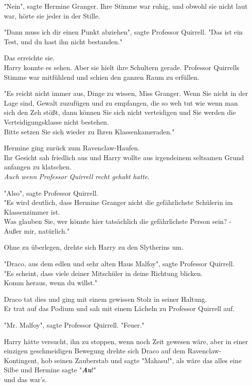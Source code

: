 {"Nein", sagte Hermine Granger. Ihre Stimme war ruhig, und obwohl sie nicht laut war, hörte sie jeder in der Stille.

"Dann muss ich dir einen Punkt abziehen", sagte Professor Quirrell. "Das ist ein Test, und du hast ihn nicht bestanden."

Das erreichte sie.\\ Harry konnte es sehen. Aber sie hielt ihre Schultern gerade. Professor Quirrells Stimme war mitfühlend und schien den ganzen Raum zu erfüllen.

"Es reicht nicht immer aus, Dinge zu wissen, Miss Granger. Wenn Sie nicht in der Lage sind, Gewalt zuzufügen und zu empfangen, die so weh tut wie wenn man sich den Zeh stößt, dann können Sie sich nicht verteidigen und Sie werden die Verteidigungsklasse nicht bestehen.\\ Bitte setzen Sie sich wieder zu Ihren Klassenkameraden."

Hermine ging zurück zum Ravenclaw-Haufen.\\ Ihr Gesicht sah friedlich aus und Harry wollte aus irgendeinem seltsamen Grund anfangen zu klatschen.\\ \emph{Auch wenn Professor Quirrell recht gehabt hatte.}

"Also", sagte Professor Quirrell.\\ "Es wird deutlich, dass Hermine Granger nicht die gefährlichste Schülerin im Klassenzimmer ist.\\ Was glauben Sie, wer könnte hier tatsächlich die gefährlichste Person sein? - Außer mir, natürlich."

Ohne zu überlegen, drehte sich Harry zu den Slytherins um.

"Draco, aus dem edlen und sehr alten Haus Malfoy", sagte Professor Quirrell.\\ "Es scheint, dass viele deiner Mitschüler in deine Richtung blicken.\\ Komm heraus, wenn du willst."

Draco tat dies und ging mit einem gewissen Stolz in seiner Haltung.\\ Er trat auf das Podium und sah mit einem Lächeln zu Professor Quirrell auf.

"Mr. Malfoy", sagte Professor Quirrell. "Feuer."

Harry hätte versucht, ihn zu stoppen, wenn noch Zeit gewesen wäre, aber in einer einzigen geschmeidigen Bewegung drehte sich Draco auf dem Ravenclaw-Kontingent, hob seinen Zauberstab und sagte "Mahasu!", als wäre das alles eine Silbe und Hermine sagte "\textbf{\emph{Au}}!"\\ und das war's.

}
